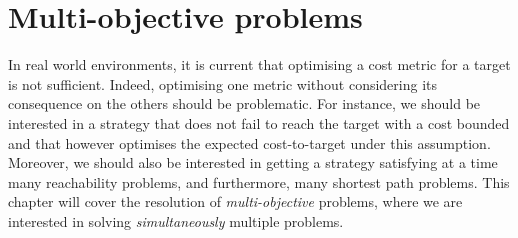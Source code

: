 \chapter{Multi-objective problems}
In real world environments, it is current that optimising a cost metric for a target is not sufficient.
Indeed, optimising one metric without considering its consequence on the others should be problematic.
For instance, we should be interested in a strategy that does not fail to reach the target with a cost bounded and that however optimises the expected cost-to-target under this assumption.
Moreover, we should also be interested in getting a strategy satisfying at a time many reachability problems, and furthermore, many shortest path problems. This chapter will cover the resolution of \textit{multi-objective} problems, where we are interested in solving \textit{simultaneously} multiple problems.
